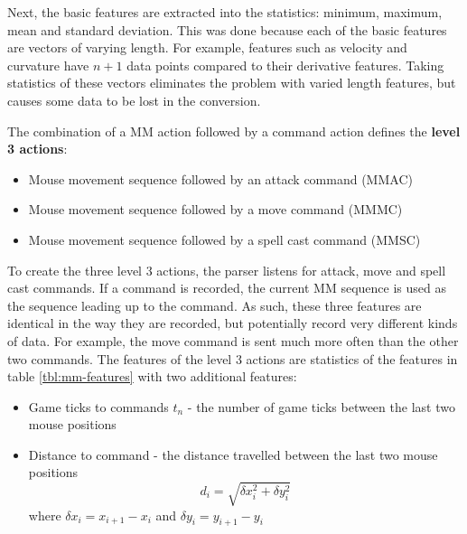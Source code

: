 \documentclass[Report.tex]{subfiles}
\begin{document}
Next, the basic features are extracted into the statistics: minimum, maximum, mean and standard deviation. This was done because each of the basic features are vectors of varying length. For example, features such as velocity and curvature have $n + 1$ data points compared to their derivative features. Taking statistics of these vectors eliminates the problem with varied length features, but causes some data to be lost in the conversion.

The combination of a MM action followed by a command action defines the \textbf{level 3 actions}:
\begin{itemize}
\item Mouse movement sequence followed by an attack command (MMAC)
\item Mouse movement sequence followed by a move command (MMMC)
\item Mouse movement sequence followed by a spell cast command (MMSC)
\end{itemize}
To create the three level 3 actions, the parser listens for attack, move and spell cast commands. If a command is recorded, the current MM sequence is used as the sequence leading up to the command. As such, these three features are identical in the way they are recorded, but potentially record very different kinds of data. For example, the move command is sent much more often than the other two commands. The features of the level 3 actions are statistics of the features in table \ref{tbl:mm-features} with two additional features:
\begin{itemize}
\item Game ticks to commands $t_n$ - the number of game ticks between the last two mouse positions
\item Distance to command - the distance travelled between the last two mouse positions
\begin{equation}
d_i = \sqrt{\delta x_{i}^2 + \delta y_{i}^2}
\end{equation} 
where $\delta x_i = x_{i+1} - x_i$ and $\delta y_i = y_{i+1} - y_i$
\end{itemize}
\end{document}
